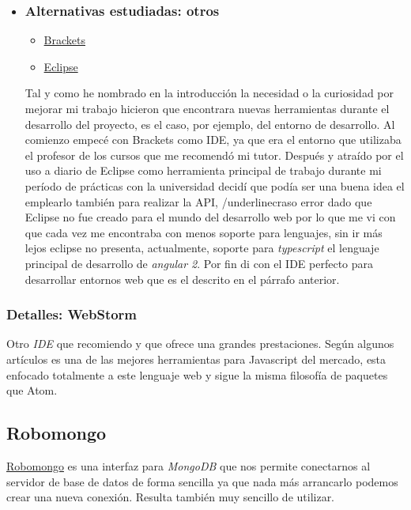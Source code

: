 \begin{itemize}
	\item \subsubsection{Alternativas estudiadas: otros}
	\begin{itemize}
		\item \hyperlink{http://brackets.io/}{Brackets}
		\item \hyperlink{http://eclipse.org}{Eclipse}
	\end{itemize}
	Tal y como he nombrado en la introducción la necesidad o la curiosidad por mejorar mi trabajo hicieron que encontrara nuevas herramientas durante el desarrollo del proyecto, es el caso, por ejemplo, del entorno de desarrollo. Al comienzo empecé con Brackets como IDE, ya que era el entorno que utilizaba el profesor de los cursos que me recomendó  mi tutor. Después y atraído por el uso a diario de Eclipse como herramienta principal de trabajo durante mi período de prácticas con la universidad decidí que podía ser una buena idea el emplearlo también para realizar la API, /underline{craso error} dado que Eclipse no fue creado para el mundo del desarrollo web por lo que me vi con que cada vez me encontraba con menos soporte para lenguajes, sin ir más lejos eclipse no presenta, actualmente, soporte para  \emph{typescript} el lenguaje principal de desarrollo de  \emph{angular 2}. Por fin di con el IDE perfecto para desarrollar entornos web que es el descrito en el párrafo anterior.
\end{itemize}
\subsubsection{Detalles: WebStorm}\label{detalle_webstorm}
Otro \emph{IDE} que recomiendo y que ofrece una grandes prestaciones. Según algunos artículos \cite{articulo2} es una de las mejores herramientas para Javascript del mercado, esta enfocado totalmente a este lenguaje web y sigue la misma filosofía de paquetes que Atom. 


\subsection{Robomongo}\label{herramientas_robomongo}
\hyperlink{http://http//robomongo.org/}{Robomongo} es una interfaz para \emph{MongoDB} que nos permite conectarnos al servidor de base de datos de forma sencilla ya que nada más arrancarlo podemos crear una nueva conexión. Resulta también muy sencillo de utilizar.



